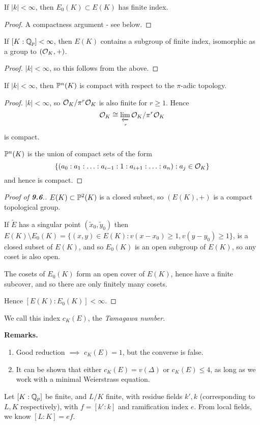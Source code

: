 \documentclass[10pt,a4paper]{article}
\begin{document}
\begin{lemma}
  If $|k|<\infty$, then $E_0(K) \subset E(K)$ has finite index.
\end{lemma}
\begin{proof}
  A compactness argument - see below.
\end{proof}
\begin{theorem}
  If $[K:\Q_p]<\infty$, then $E(K)$ contains a subgroup of finite index, isomorphic as a group to $(\O_K, +)$.
\end{theorem}
\begin{proof}
  $|k|<\infty$, so this follows from the above.
\end{proof}
\begin{lemma}
  If $|k|<\infty$, then $\P^n(K)$ is compact with respect to the $\pi$-adic topology.
\end{lemma}
\begin{proof}
  $|k|<\infty$, so $\O_K/\pi^r\O_K$ is also finite for $r \geq 1$. Hence
  \[\O_K \cong \lim_{\xleftarrow[r]{}}\O_K/\pi^r\O_K\]
  is compact.

  $\P^n(K)$ is the union of compact sets of the form
  \[\{(a_0:a_1:\ldots:a_{i-1}:1:a_{i+1}:\ldots:a_n):a_j \in \O_K\}\]
  and hence is compact.
\end{proof}
\begin{proof}[Proof of \textbf{9.6}.]
  $E(K)\subset \P^2(K)$ is a closed subset, so $(E(K), +)$ is a compact topological group.

  If $\tilde{E}$ has a singular point $(\tilde{x}_0, \tilde{y}_0)$ then $E(K)\setminus E_0(K) = \{(x,y) \in E(K):v(x-x_0)\geq 1, v(y-y_0) \geq 1\}$, is a closed subset of $E(K)$, and so $E_0(K)$ is an open subgroup of $E(K)$, so any coset is also open.

  The cosets of $E_0(K)$ form an open cover of $E(K)$, hence have a finite subcover, and so there are only finitely many cosets.

  Hence $[E(K):E_0(K)] < \infty$.
\end{proof}
We call this index $c_K(E)$, the \emph{Tamagawa number}.

\textbf{Remarks.}
\begin{enumerate}
  \item Good reduction $\implies$ $c_K(E) = 1$, but the converse is false.
  \item It can be shown that either $c_K(E) = v(\Delta)$ or $c_K(E) \leq 4$, as long as we work with a minimal Weierstrass equation.
\end{enumerate}
Let $[K:\Q_p]$ be finite, and $L/K$ finite, with residue fields $k', k$ (corresponding to $L, K$ respectively), with $f = [k':k]$ and ramification index $e$. From local fields, we know $[L:K] = ef$.
\end{document}
